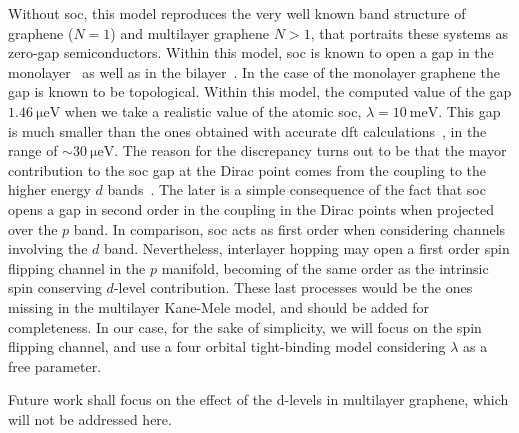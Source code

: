 Without \ac{soc}, this model reproduces the very well known band structure of graphene ($N=1$) and multilayer graphene $N>1$, that portraits these systems as zero-gap semiconductors. Within this model, \ac{soc} is known to open a gap in the monolayer~\cite{Min2006}  as well as in the bilayer~\cite{Konschuh2012,Guinea2010,Cortijo2010}. In the case of the monolayer graphene the gap is known to be topological. Within this model, the computed value of the gap $\SI{1.46}{\micro\eV}$ when we take a realistic value of the atomic \ac{soc}, $\lambda=\SI{10}{\meV}$. This gap is much smaller than the ones obtained with accurate \ac{dft} calculations~\cite{Konschuh2011a}, in the range of $\sim\SI{30}{\micro\eV}$.
The reason for the discrepancy turns out to be that the mayor contribution to the \ac{soc} gap at the Dirac point comes from the coupling to the higher energy $d$ bands~\cite{Konschuh2012,Konschuh2011a}.
The later is a simple consequence of the fact that \ac{soc} opens a gap in second order in the coupling in the Dirac points when projected over the $p$ band. In comparison, \ac{soc} acts as first order when considering channels involving the $d$ band.
Nevertheless, interlayer hopping may open a first order spin flipping channel in the $p$ manifold, becoming of the same order as the intrinsic spin conserving $d$-level contribution.
These last processes would be the ones missing in the multilayer Kane-Mele model, and should be added for completeness.
In our case, for the sake of simplicity, we will focus on the spin flipping channel, and use a four orbital tight-binding model considering $\lambda$ as a free parameter.

Future work shall focus on the effect of the d-levels in multilayer graphene, which will not be addressed here.

